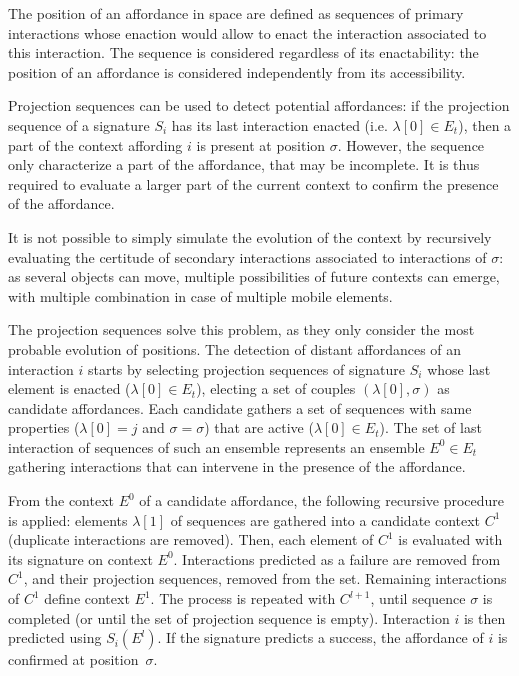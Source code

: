 \documentclass[conference]{IEEEtran}
\begin{document}
The position of an affordance in space are defined as sequences of primary interactions whose enaction would allow to enact the interaction associated to this interaction. The sequence is considered regardless of its enactability: the position of an affordance is considered independently from its accessibility.


Projection sequences can be used to detect potential affordances: if the projection sequence of a signature $S_i$ has its last interaction enacted (i.e. $\lambda[0] \in E_t$), then a part of the context affording $i$ is present at position $\sigma$. However, the sequence only characterize a part of the affordance, that may be incomplete. It is thus required to evaluate a larger part of the current context to confirm the presence of the affordance.

It is not possible to simply simulate the evolution of the context by recursively evaluating the certitude of secondary interactions associated to interactions of $\sigma$: as several objects can move, multiple possibilities of future contexts can emerge, with multiple combination in case of multiple mobile elements.

The projection sequences solve this problem, as they only consider the most probable evolution of positions. The detection of distant affordances of an interaction $i$ starts by selecting projection sequences of signature $S_i$ whose last element is enacted ($\lambda[0] \in E_t$), electing a set of couples $(\lambda[0],\sigma)$ as candidate affordances. Each candidate gathers a set of sequences with same properties ($\lambda[0]=j$ and $\sigma=\sigma$) that are active ($\lambda[0]\in E_t$). The set of last interaction of sequences of such an ensemble represents an ensemble $E^0 \in E_t$ gathering interactions that can intervene in the presence of the affordance.

From the context $E^0$ of a candidate affordance, the following recursive procedure is applied: elements $\lambda[1]$ of sequences are gathered into a candidate context $C^1$ (duplicate interactions are removed). Then, each element of $C^1$ is evaluated with its signature on context $E^0$. Interactions predicted as a failure are removed from $C^1$, and their projection sequences, removed from the set. Remaining interactions of $C^1$ define context $E^1$. The process is repeated with $C^{l+1}$, until sequence $\sigma$ is completed (or until the set of projection sequence is empty). Interaction $i$ is then predicted using $S_i(E^l)$. If the signature predicts a success, the affordance of $i$ is confirmed at position~$\sigma$.
\end{document}
